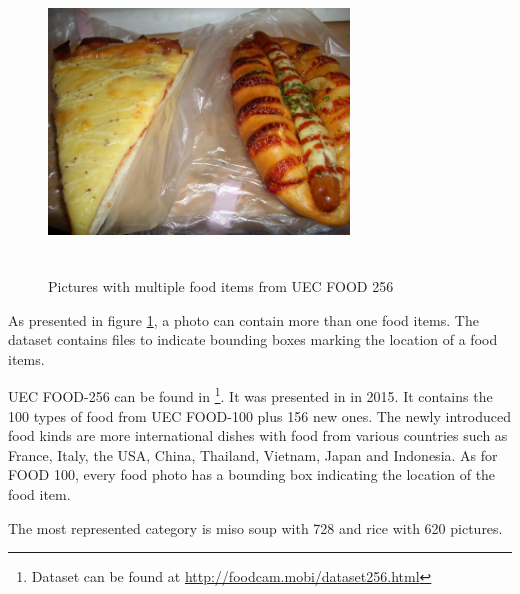 \begin{figure}[h]
    \includegraphics[width=8cm, height=8cm]{img/multiple_food_items_4}
    \caption{Pictures with multiple food items from UEC FOOD 256}
    \label{fig:presentation_multiple_food_items}
\end{figure}

As presented in figure \ref{fig:presentation_multiple_food_items}, a photo can contain more than one food items. The dataset contains files to indicate bounding boxes marking the location of a food items.

UEC FOOD-256 can be found in \footnote{Dataset can be found at \url{http://foodcam.mobi/dataset256.html}}. It was presented in \cite{Kawano2015} in 2015. It contains  the 100 types of food from UEC FOOD-100 plus 156 new ones. The newly introduced food kinds are more international dishes with food from various countries such as France, Italy, the USA, China, Thailand, Vietnam, Japan and Indonesia. As for FOOD 100, every food photo has a bounding box indicating the location of the food item.

The most represented category is miso soup with 728 and rice with 620 pictures.